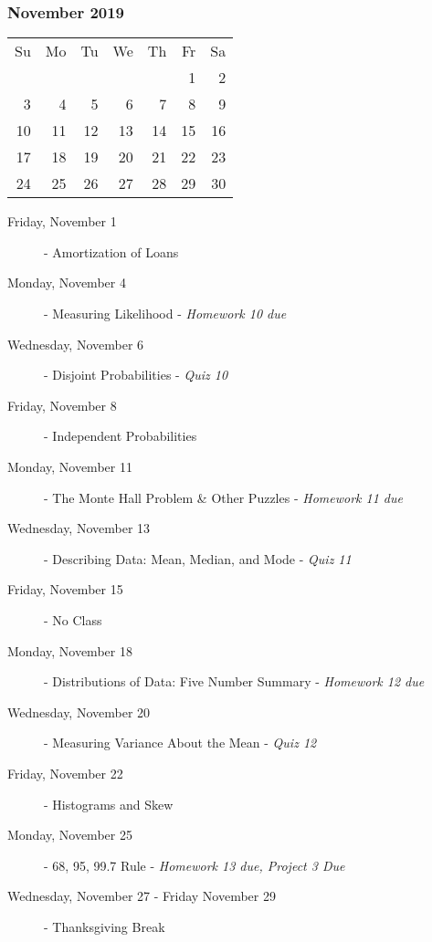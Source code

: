 \subsubsection*{November 2019}
\begin{tabular}{rrrrrrr}
Su & Mo & Tu & We & Th & Fr & Sa\\
   &    &    &    &    &  1 &  2\\
 3 &  4 &  5 &  6 &  7 &  8 &  9\\
10 & 11 & 12 & 13 & 14 & 15 & 16\\
17 & 18 & 19 & 20 & 21 & 22 & 23\\
24 & 25 & 26 & 27 & 28 & 29 & 30\\
\end{tabular}
\begin{description}
\item[Friday, November 1]
  - Amortization of Loans 

\item[Monday, November 4]
  - Measuring Likelihood - {\em Homework 10 due}
\item[Wednesday, November 6]
  - Disjoint Probabilities - {\em Quiz 10}
\item[Friday, November 8]
  - Independent Probabilities

\item[Monday, November 11]
  - The Monte Hall Problem \& Other Puzzles - {\em Homework 11 due}
\item[Wednesday, November 13]
  - Describing Data: Mean, Median, and Mode - {\em Quiz 11}
\item[Friday, November 15] - No Class

\item[Monday, November 18]
  - Distributions of Data: Five Number Summary - {\em Homework 12 due}
\item[Wednesday, November 20]
  - Measuring Variance About the Mean - {\em Quiz 12}
\item[Friday, November 22]
  - Histograms and Skew 

\item[Monday, November 25]
  - 68, 95, 99.7 Rule - {\em Homework 13 due, Project 3 Due}
\item[Wednesday, November 27 - Friday November 29] - Thanksgiving Break
\end{description}

\hrulefill
